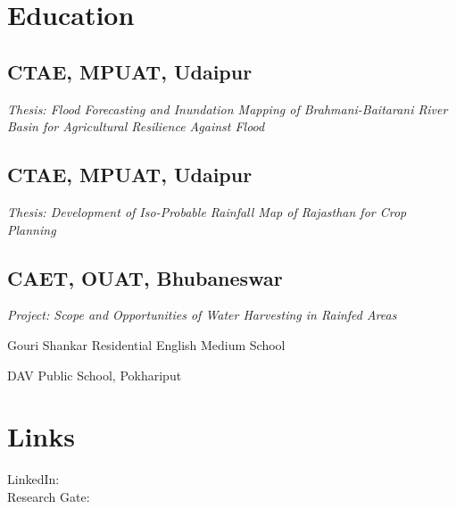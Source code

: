 \documentclass[]{deedy-resume-openfont}
\begin{document}
\begin{minipage}[t]{0.30\textwidth}


\section{Education}

\subsection{CTAE, MPUAT, Udaipur}
\textit{Thesis: Flood Forecasting and Inundation Mapping of Brahmani-Baitarani River Basin for Agricultural Resilience Against Flood}
\sectionsep

\subsection{CTAE, MPUAT, Udaipur}
\textit{Thesis: Development of Iso-Probable Rainfall Map of Rajasthan for Crop Planning}
\sectionsep

\subsection{CAET, OUAT, Bhubaneswar}
\textit{Project: Scope and Opportunities of Water Harvesting in Rainfed Areas}
\sectionsep

Gouri Shankar Residential English Medium School\\
\sectionsep

DAV Public School, Pokhariput\\
\sectionsep


\section{Links}
LinkedIn: \href{https://www.linkedin.com/in/rageswari-subudhi-250812179/}{} \\
Research Gate: \href{https://www.researchgate.net/scientific-contributions/2135966431_Rageswari_Subudhi}{} \\
\sectionsep


\end{minipage}
\end{document}
